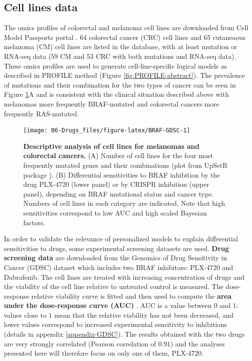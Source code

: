 \documentclass[a4paper,12pt,twoside,onecolumn,openright,final,oldfontcommands]{memoir}
\begin{document}
\subsection{Cell lines data}\label{cell-lines-data}

The omics profiles of colorectal and melanoma cell lines are downloaded
from Cell Model Passports portal \citep{van2019cell}. 64 colorectal
cancer (CRC) cell lines and 65 cutaneaous melanoma (CM) cell lines are
listed in the database, with at least mutation or RNA-seq data (59 CM
and 53 CRC with both mutations and RNA-seq data). These omics profiles
are used to generate cell-line-specific logical models as described in
PROFILE method (Figure \ref{fig:PROFILE-abstract}). The prevalence of
mutations and their combination for the two types of cancer can be seen
in Figure \ref{fig:BRAF-GDSC}A and is consistent with the clinical
situation described above with melanomas more frequently BRAF-mutated
and colorectal cancers more frequently RAS-mutated.

\begin{figure}

{\centering \texttt{[image: 06-Drugs\_files/figure-latex/BRAF-GDSC-1]} 

}

\caption[Descriptive analysis of cell lines for melanomas and colorectal cancers]{\textbf{Descriptive analysis of cell lines for
melanomas and colorectal cancers.} (A) Number of cell lines for the four
most frequently mutated genes and their combinations (plot from UpSetR
package \citep{conway2017upsetr}). (B) Differential sensitivities to
BRAF inhibition by the drug PLX-4720 (lower panel) or by CRISPR
inhibition (upper panel), depending on BRAF mutational status and cancer
type. Numbers of cell lines in each category are indicated. Note that
high sensitivities correspond to low AUC and high scaled Bayesian
factors.}\label{fig:BRAF-GDSC}
\end{figure}











In order to validate the relevance of personalized models to explain
differential sensitivities to drugs, some experimental screening
datasets are used. \textbf{Drug screening data} are downloaded from the
Genomics of Drug Sensitivity in Cancer (GDSC) dataset
\citep{yang2012genomics} which includes two BRAF inhibitors: PLX-4720
and Dabrafenib. The cell lines are treated with increasing concentration
of drugs and the viability of the cell line relative to untreated
control is measured. The dose-response relative viability curve is
fitted and then used to compute the \textbf{area under the dose-response
curve (AUC)} \citep{vis2016multilevel}. AUC is a value between \(0\) and
\(1\): values close to \(1\) mean that the relative viability has not
been decreased, and lower values correspond to increased experimental
sensitivity to inhibitions (details in appendix \ref{appendix-GDSC}).
The results obtained with the two drugs are very strongly correlated
(Pearson correlation of \(0.91\)) and the analyses presented here will
therefore focus on only one of them, PLX-4720.
\end{document}
